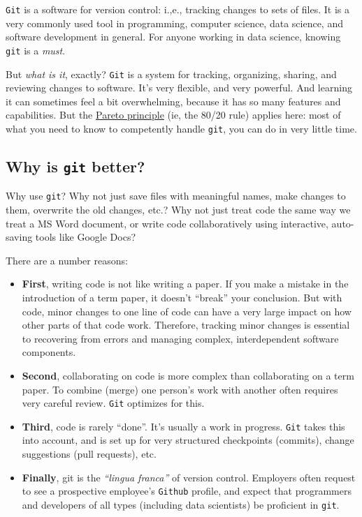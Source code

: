 \documentclass[]{book}
\begin{document}
\texttt{Git} is a software for version control: i.,e., tracking changes to sets of files. It is a very commonly used tool in programming, computer science, data science, and software development in general. For anyone working in data science, knowing \texttt{git} is a \emph{must}.

But \emph{what is it}, exactly? \texttt{Git} is a system for tracking, organizing, sharing, and reviewing changes to software. It's very flexible, and very powerful. And learning it can sometimes feel a bit overwhelming, because it has so many features and capabilities. But the \href{https://en.wikipedia.org/wiki/Pareto_principle}{Pareto principle} (ie, the 80/20 rule) applies here: most of what you need to know to competently handle \texttt{git}, you can do in very little time.

\hypertarget{why-is-git-better}{%
\subsection*{\texorpdfstring{Why is \texttt{git} better?}{Why is git better?}}\label{why-is-git-better}}

Why use \texttt{git}? Why not just save files with meaningful names, make changes to them, overwrite the old changes, etc.? Why not just treat code the same way we treat a MS Word document, or write code collaboratively using interactive, auto-saving tools like Google Docs?

There are a number reasons:

\begin{itemize}
\item
  \textbf{First}, writing code is not like writing a paper. If you make a mistake in the introduction of a term paper, it doesn't ``break'' your conclusion. But with code, minor changes to one line of code can have a very large impact on how other parts of that code work. Therefore, tracking minor changes is essential to recovering from errors and managing complex, interdependent software components.
\item
  \textbf{Second}, collaborating on code is more complex than collaborating on a term paper. To combine (merge) one person's work with another often requires very careful review. \texttt{Git} optimizes for this.
\item
  \textbf{Third}, code is rarely ``done''. It's usually a work in progress. \texttt{Git} takes this into account, and is set up for very structured checkpoints (commits), change suggestions (pull requests), etc.
\item
  \textbf{Finally}, git is the \emph{``lingua franca''} of version control. Employers often request to see a prospective employee's \texttt{Github} profile, and expect that programmers and developers of all types (including data scientists) be proficient in \texttt{git}.
\end{itemize}
\end{document}
